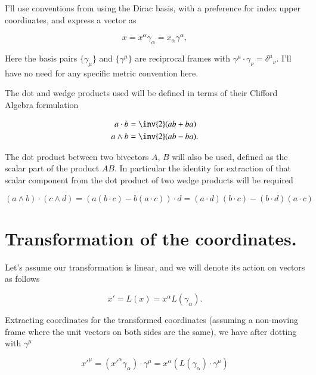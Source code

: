 I'll use conventions from \citep{doran2003gap} using the Dirac basis, with a preference for index upper coordinates, and express a vector as

\begin{equation}\label{eqn:antisymmetricTensorTx:20}
x = x^\alpha \gamma_\alpha = x_\alpha \gamma^\alpha,
\end{equation}

Here the basis pairs $\{\gamma_\mu\}$ and $\{\gamma^\mu\}$ are reciprocal frames with $\gamma^\mu \cdot \gamma_\nu = {\delta^\mu}_\nu$.  I'll have no need for any specific metric convention here.

The dot and wedge products used will be defined in terms of their Clifford Algebra formulation

\begin{align}\label{eqn:antisymmetricTensorTx:25}
a \cdot b &= \inv{2} (a b + b a) \\
a \wedge b &= \inv{2} (a b - b a).
\end{align}

The dot product between two bivectors $A$, $B$ will also be used, defined as the scalar part of the product $AB$.  In particular the identity for extraction of that scalar component from the dot product of two wedge products will be required

\begin{equation}\label{eqn:antisymmetricTensorTx:26}
(a \wedge b ) \cdot (c \wedge d)
= ( a (b \cdot c) - b ( a \cdot c) ) \cdot d
= (a \cdot d) (b \cdot c) - (b \cdot d) ( a \cdot c) 
\end{equation}

\section{Transformation of the coordinates.}

Let's assume our transformation is linear, and we will denote its action on vectors as follows

\begin{equation}\label{eqn:antisymmetricTensorTx:30}
x' = L(x) = x^\alpha L( \gamma_\alpha).
\end{equation}

Extracting coordinates for the transformed coordinates (assuming a non-moving frame where the unit vectors on both sides are the same), we have after dotting with $\gamma^\mu$

\begin{equation}\label{eqn:antisymmetricTensorTx:40}
{x'}^\mu = \left( {x'}^\alpha \gamma_\alpha \right) \cdot \gamma^\mu
= x^\alpha \left( L( \gamma_\alpha) \cdot \gamma^\mu \right) 
\end{equation}

